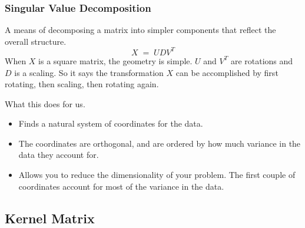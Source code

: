 \documentclass[serif]{beamer}
\begin{document}
	\begin{frame}[t]
       \frametitle{Singular Value Decomposition}
       A means of decomposing a matrix into simpler 
       components that reflect the overall structure.
       \begin{equation}                             
         X\;=\;UDV^{T}                             
       \end{equation}
       When $X$ is a square matrix, the geometry is simple.
       $U$ and $V^{T}$ are rotations and $D$
       is a scaling. So it says the transformation $X$ can
       be accomplished by first rotating, then scaling, then
       rotating again.

       \begin{block}{What this does for us.}
         \begin{itemize}
           \item Finds a natural system of coordinates for
             the data.
           \item The coordinates are orthogonal, and are 
             ordered by how much variance in the data they
             account for.
           \item Allows you to reduce the dimensionality of
             your problem. The first couple of coordinates
             account for most of the variance in the data.
         \end{itemize}
       \end{block}                           
     \end{frame}

	\subsection{Kernel Matrix}
	
\end{document}
